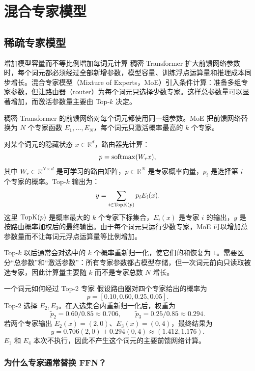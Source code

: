 \part{混合专家模型}

\chapter{稀疏专家模型}
\label{sec:moe}

\begin{motivationbox}{增加模型容量而不等比例增加每词元计算}
稠密 Transformer 扩大前馈网络参数时，每个词元都必须经过全部新增参数，模型容量、训练浮点运算量和推理成本同步增长。混合专家模型（Mixture of Experts，MoE）引入条件计算：准备多组专家参数，但让路由器（router）为每个词元只选择少数专家。这样总参数量可以显著增加，而激活参数量主要由 Top-$k$ 决定。
\end{motivationbox}

稠密 Transformer 的前馈网络对每个词元都使用同一组参数。MoE 把前馈网络替换为 $N$ 个专家函数 $E_1,\ldots,E_N$，每个词元只激活概率最高的 $k$ 个专家。

\figMoE

对某个词元的隐藏状态 $x\in\mathbb R^d$，路由器先计算：
\[
p=\operatorname{softmax}(W_rx),
\]
其中 $W_r\in\mathbb R^{N\times d}$ 是可学习的路由矩阵，$p\in\mathbb R^N$ 是专家概率向量，$p_i$ 是选择第 $i$ 个专家的概率。Top-$k$ 输出为：
\[
y=\sum_{i\in\operatorname{TopK}(p)}p_iE_i(x).
\]
这里 $\operatorname{TopK}(p)$ 是概率最大的 $k$ 个专家下标集合，$E_i(x)$ 是专家 $i$ 的输出，$y$ 是按路由概率加权后的最终输出。由于每个词元只运行少数专家，MoE 可以增加总参数量而不让每词元浮点运算量等比例增加。

Top-$k$ 以后通常会对选中的 $k$ 个概率重新归一化，使它们的和恢复为 $1$。需要区分“总参数”和“激活参数”：所有专家参数都占模型存储，但一次词元前向只读取被选专家，因此计算量主要随 $k$ 而不是专家总数 $N$ 增长。

\begin{examplebox}{一个词元如何经过 Top-2 专家}
假设路由器对四个专家给出的概率为
\[
p=[0.10,0.60,0.25,0.05].
\]
Top-2 选择 $E_2,E_3$。在入选集合内重新归一化后，权重为
\[
\tilde p_2=0.60/0.85\approx0.706,\qquad
\tilde p_3=0.25/0.85\approx0.294.
\]
若两个专家输出 $E_2(x)=(2,0)$、$E_3(x)=(0,4)$，最终结果为
\[
y=0.706(2,0)+0.294(0,4)\approx(1.412,1.176).
\]
$E_1$ 和 $E_4$ 本次不执行，因此不产生这个词元的主要前馈网络计算。
\end{examplebox}

\section{为什么专家通常替换 FFN？}

